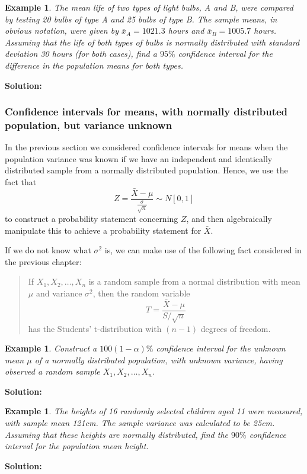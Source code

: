 \documentclass[12pt]{article}
\theoremstyle{break}
\newtheorem{example}[theorem]{Example}
\begin{document}
\begin{example}
The mean life of two types of light bulbs, A and B, were compared by testing 20 bulbs of type A and 25 bulbs of type B. The sample means, in obvious notation, were given by $\bar{x}_{A}=1021.3$ hours and $\bar{x}_{B}=1005.7$ hours. Assuming that the life of both types of bulbs is normally distributed with standard deviation 30 hours (for both cases), find a $95\%$ confidence interval for the difference in the population means for both types.
\end{example}
\begin{mdframed}
{\bf Solution:}
\textcolor[rgb]{1.00,1.00,1.00}{\lipsum[1-4]}
\end{mdframed}

\subsubsection{Confidence intervals for means, with normally distributed population, but variance unknown}
In the previous section we considered confidence intervals for means when the population variance was known if we have an independent and identically distributed sample from a normally distributed population. Hence, we use the fact that $$Z=\frac{\bar{X}-\mu}{\frac{\sigma}{\sqrt{n}}}\sim N[0,1]$$
to construct a probability statement concerning $Z$, and then algebraically manipulate this to achieve a probability statement for $\bar{X}$.

If we do not know what $\sigma^{2}$ is, we can make use of the following fact considered in the previous chapter:
\begin{quote}
If $X_{1},X_{2},\ldots,X_{n}$ is a random sample from a normal distribution with mean $\mu$ and variance $\sigma^2$, then the random variable $$ T=\frac{\bar{X}-\mu}{S/\sqrt{n}}$$ has the Students' t-distribution with $(n-1)$ degrees of freedom.
\end{quote}

\begin{example}
Construct a $100(1-\alpha)\%$ confidence interval for the unknown mean $\mu$ of a normally distributed population, with unknown variance, having observed a random sample $X_{1},X_{2},\ldots, X_{n}.$
\end{example}
\begin{mdframed}
{\bf Solution:}
\textcolor[rgb]{1.00,1.00,1.00}{\lipsum[1-8]}
\end{mdframed}

\begin{example}
The heights of 16 randomly selected children aged 11 were measured, with sample mean 121cm. The sample variance was calculated to be 25cm. Assuming that these heights are normally distributed, find the $90\%$ confidence interval for the population mean height.
\end{example}
\begin{mdframed}
{\bf Solution:}
\textcolor[rgb]{1.00,1.00,1.00}{\lipsum[1-2]}
\end{mdframed}
\end{document}
